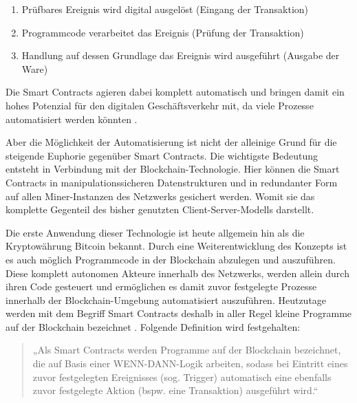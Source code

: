     \begin{enumerate}
        \item Prüfbares Ereignis wird digital ausgelöst (Eingang der Transaktion)
        \item Programmcode verarbeitet das Ereignis (Prüfung der Transaktion)
        \item Handlung auf dessen Grundlage das Ereignis wird ausgeführt (Ausgabe der Ware)
    \end{enumerate}

Die Smart Contracts agieren dabei komplett automatisch und bringen damit ein hohes Potenzial für den digitalen Geschäftsverkehr mit,
da viele Prozesse automatisiert werden könnten \parencite[vgl.][27]{JohannesScherk.2017}.

Aber die Möglichkeit der Automatisierung ist nicht der alleinige Grund für die steigende Euphorie gegenüber Smart Contracts.
Die wichtigste Bedeutung entsteht in Verbindung mit der Blockchain-Technologie.
Hier können die Smart Contracts in manipulationssicheren Datenstrukturen und in redundanter Form auf allen Miner-Instanzen des Netzwerks gesichert werden.
Womit sie das komplette Gegenteil des bisher genutzten Client-Server-Modells darstellt.

Die erste Anwendung dieser Technologie ist heute allgemein hin als die Kryptowährung Bitcoin bekannt.
Durch eine Weiterentwicklung des Konzepts ist es auch möglich Programmcode in der Blockchain abzulegen und auszuführen.
Diese komplett autonomen Akteure innerhalb des Netzwerks, werden allein durch ihren Code gesteuert und ermöglichen es damit zuvor festgelegte Prozesse innerhalb der Blockchain-Umgebung automatisiert auszuführen.
Heutzutage werden mit dem Begriff Smart Contracts deshalb in aller Regel kleine Programme auf der Blockchain bezeichnet \parencite[vgl.][4]{WILKENS.2019}.
Folgende Definition wird festgehalten:

    \begin{quote}
        „Als Smart Contracts werden Programme auf der Blockchain bezeichnet, die auf Basis einer WENN-DANN-Logik arbeiten, 
        sodass bei Eintritt eines zuvor festgelegten Ereignisses (sog. Trigger)
        automatisch eine ebenfalls zuvor festgelegte Aktion (bspw. eine Transaktion) ausgeführt wird.“
        \parencite[4]{WILKENS.2019}
    \end{quote}

